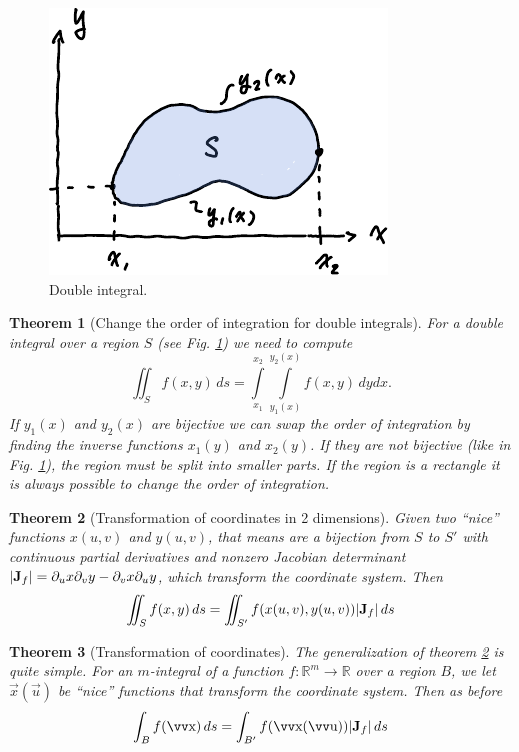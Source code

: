 \documentclass[twocolumn, margin=normal]{tex/hsrzf}
\theoremstyle{fuvarzf}
\newtheorem{theorem}{Theorem}
\begin{document}
\begin{figure}
  \centering
  \includegraphics{img/double-integral}
  \caption{
    Double integral.
    \label{fig:double-integral}
  }
\end{figure}

\begin{theorem}[Change the order of integration for double integrals] For a
  double integral over a region \(S\) (see Fig.  \ref{fig:double-integral}) we
  need to compute
  \[
    \iint_S f(x,y) \,ds =
      \int\limits_{x_1}^{x_2} \int\limits_{y_1(x)}^{y_2(x)} f(x,y) \,dydx .
  \]
  If \(y_1(x)\) and \(y_2(x)\) are bijective we can swap the order of
  integration by finding the inverse functions \(x_1(y)\) and \(x_2(y)\). If
  they are not bijective (like in Fig. \ref{fig:double-integral}), the region
  must be split into smaller parts. If the region is a rectangle it is always
  possible to change the order of integration.
\end{theorem}

\begin{theorem}[Transformation of coordinates in 2 dimensions]
  \label{thm:transform-coords}
  Given two ``nice'' functions \(x(u,v)\) and \(y(u,v)\), that means are a
  bijection from \(S\) to \(S'\) with continuous partial derivatives and
  nonzero Jacobian determinant \(|\bm{\mathrm{J}}_f| = \partial_u x \partial_v y -
  \partial_v x \partial_u y\), which transform the coordinate system. Then
  \[
    \iint_S f(x,y) \,ds = \iint_{S'} f(x(u,v), y(u,v)) |\bm{\mathrm{J}}_f| \,ds
  \]
\end{theorem}

\begin{theorem}[Transformation of coordinates]
  The generalization of theorem \ref{thm:transform-coords} is quite simple.
  For an \(m\)-integral of a function \(f:\mathbb{R}^m\to\mathbb{R}\) over a
  region \(B\), we let \(\vec{x}(\vec{u})\) be ``nice'' functions that
  transform the coordinate system. Then as before
  \[
    \int_B f(\vec{x}) \,ds = \int_{B'} f(\vec{x}(\vec{u})) |\mx{J}_f| \,ds
  \]
\end{theorem}
\end{document}
